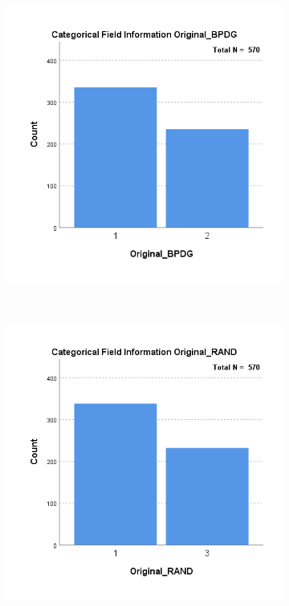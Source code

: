 \documentclass{UoYCSproject}
\begin{document}
  \begin{figure}[htb]
    \centering
    \begin{subfigure}[b]{0.45\textwidth}
      \centering
      \includegraphics[width=\textwidth]{ExternalValidation/cat_info_original_bpdg.png}
    \end{subfigure}
    ~
    \begin{subfigure}[b]{0.45\textwidth}
      \centering
      \includegraphics[width=\textwidth]{ExternalValidation/cat_info_original_rand.png}

\end{subfigure}
\end{figure}
\end{document}
